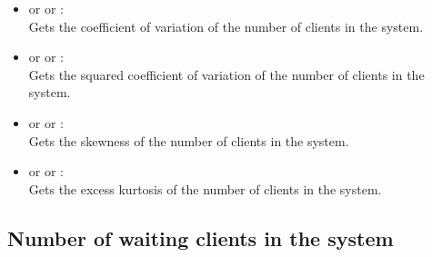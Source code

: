 \begin{itemize}
\item
{} or  or :\\
Gets the coefficient of variation of the number of clients in the system.

\item
{} or  or :\\
Gets the squared coefficient of variation of the number of clients in the system.

\item
{} or  or :\\
Gets the skewness of the number of clients in the system.

\item
{} or  or :\\
Gets the excess kurtosis of the number of clients in the system.

\end{itemize}



\subsection{Number of waiting clients in the system}

